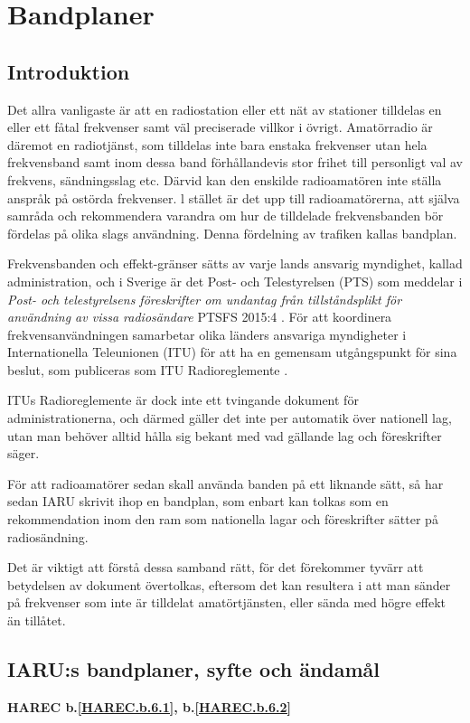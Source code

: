 \section{Bandplaner}

\subsection{Introduktion}

Det allra vanligaste är att en radiostation eller ett nät av stationer tilldelas
en eller ett fåtal frekvenser samt väl preciserade villkor i övrigt. Amatörradio
är däremot en radiotjänst, som tilldelas inte bara enstaka frekvenser utan hela
frekvensband samt inom dessa band förhållandevis stor frihet till personligt val
av frekvens, sändningsslag etc.  Därvid kan den enskilde radioamatören inte
ställa anspråk på ostörda frekvenser. l stället är det upp till radioamatörerna,
att själva samråda och rekommendera varandra om hur de tilldelade frekvensbanden
bör fördelas på olika slags användning. Denna fördelning av trafiken kallas
bandplan.

Frekvensbanden och effekt-gränser sätts av varje lands ansvarig myndighet,
kallad administration, och i Sverige är det Post- och Telestyrelsen (PTS) som
meddelar i \emph{Post- och telestyrelsens föreskrifter om undantag från
tillståndsplikt för användning av vissa radiosändare} PTSFS 2015:4
\cite{PTSFS2015:4}. För att koordinera frekvensanvändningen samarbetar olika
länders ansvariga myndigheter i Internationella Teleunionen (ITU) för att
ha en gemensam utgångspunkt för sina beslut, som publiceras som ITU
Radioreglemente \cite{ITU-RR}.

ITUs Radioreglemente är dock inte ett tvingande dokument för
administrationerna, och därmed gäller det inte per automatik över
nationell lag, utan man behöver alltid hålla sig bekant med vad gällande lag
och föreskrifter säger.

För att radioamatörer sedan skall använda banden på ett liknande sätt, så har
sedan IARU skrivit ihop en bandplan, som enbart kan tolkas som en
rekommendation inom den ram som nationella lagar och föreskrifter sätter på
radiosändning.

Det är viktigt att förstå dessa samband rätt, för det förekommer tyvärr att
betydelsen av dokument övertolkas, eftersom det kan resultera i att man sänder
på frekvenser som inte är tilldelat amatörtjänsten, eller sända med högre
effekt än tillåtet.

\subsection{IARU:s bandplaner, syfte och ändamål}
\textbf{
HAREC b.\ref{HAREC.b.6.1}\label{myHAREC.b.6.1},
 b.\ref{HAREC.b.6.2}\label{myHAREC.b.6.2}
}

